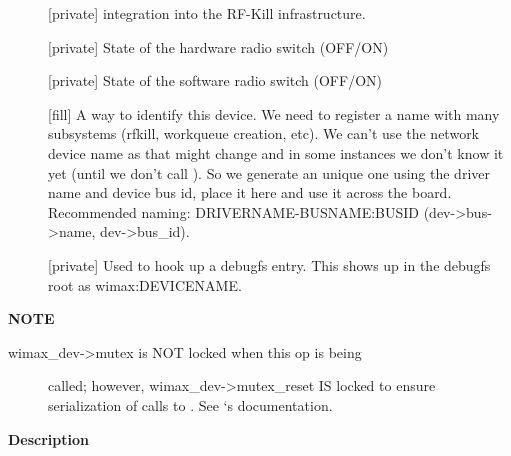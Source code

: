 \documentclass[a4paper,8pt,english]{sphinxmanual}
\begin{document}
\begin{description}
\item[{}] \leavevmode
{[}private{]} integration into the RF-Kill infrastructure.

\item[{}] \leavevmode
{[}private{]} State of the hardware radio switch (OFF/ON)

\item[{}] \leavevmode
{[}private{]} State of the software radio switch (OFF/ON)

\item[{}] \leavevmode
{[}fill{]} A way to identify this device. We need to register a
name with many subsystems (rfkill, workqueue creation, etc).
We can't use the network device name as that
might change and in some instances we don't know it yet (until
we don't call {\hyperref[networking/kapi:c.register_netdev]{\emph{}}}). So we generate an unique one
using the driver name and device bus id, place it here and use
it across the board. Recommended naming:
DRIVERNAME-BUSNAME:BUSID (dev-\textgreater{}bus-\textgreater{}name, dev-\textgreater{}bus\_id).

\item[{}] \leavevmode
{[}private{]} Used to hook up a debugfs entry. This
shows up in the debugfs root as wimax:DEVICENAME.

\end{description}

\textbf{NOTE}
\begin{description}
\item[{wimax\_dev-\textgreater{}mutex is NOT locked when this op is being}] \leavevmode
called; however, wimax\_dev-\textgreater{}mutex\_reset IS locked to ensure
serialization of calls to {\hyperref[networking/kapi:c.wimax_reset]{\emph{}}}.
See {\hyperref[networking/kapi:c.wimax_reset]{\emph{}}}`s documentation.

\end{description}

\textbf{Description}
\end{document}
